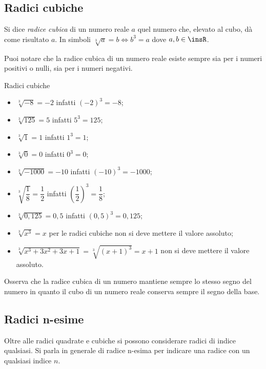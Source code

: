 \subsection{Radici cubiche}
\begin{definizione}
 Si dice \emph{radice cubica} di un numero reale $a$ quel numero che, elevato al cubo, dà come risultato $a$. In simboli $\sqrt[3]a=b \Leftrightarrow b^3=a$ dove $a,b\in \insR$.
\end{definizione}
Puoi notare che la radice cubica di un numero reale esiste sempre sia per i numeri positivi o nulli, sia per i numeri negativi.
\begin{exrig}
\begin{esempio}
Radici cubiche
 \begin{multicols}{2}
 \begin{itemize}
\item $\sqrt[3]{-8}=-2$ infatti $\left(-2\right)^3=-8$;
\item $\sqrt[3]{125}=5$ infatti $5^3=125$;
\item $\sqrt[3]1=1$ infatti $1^3=1$;
\item $\sqrt[3]0=0$ infatti $0^3=0$;
\item $\sqrt[3]{-1000}=-10$ infatti $\left(-10\right)^3=-1000$;
\item $\sqrt[3]{\dfrac 1 8}=\dfrac 1 2$ infatti $\left(\dfrac 1 2\right)^3=\dfrac 1 8$;
\item $\sqrt[3]{0,125}=0,5$ infatti $(0,5)^3=0,125$;
\item $\sqrt[3]{x^3}=x$ per le radici cubiche non si deve mettere il valore assoluto;
\item $\sqrt[3]{x^3+3x^2+3x+1}=\sqrt[3]{(x+1)^3}=x+1$ non si deve mettere il valore assoluto.
\end{itemize}
\end{multicols}
\end{esempio}
\end{exrig}
Osserva che la radice cubica di un numero mantiene sempre lo stesso segno del numero in quanto il cubo di un numero reale conserva sempre il segno della base.


\subsection{Radici n-esime}
Oltre alle radici quadrate e cubiche si possono considerare radici di indice qualsiasi. Si parla in generale di radice n-esima per indicare una radice con un qualsiasi indice $n$.

